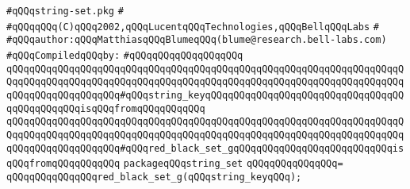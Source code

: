 \label{src/lib/src/string-set.pkg}
\verb|#qQQqstring-set.pkg|\newline
\verb|#|\newline
\verb|#qQQqqQQq(C)qQQq2002,qQQqLucentqQQqTechnologies,qQQqBellqQQqLabs|\newline
\verb|#|\newline
\verb|#qQQqauthor:qQQqMatthiasqQQqBlumeqQQq(blume@research.bell-labs.com)|\newline
\newline
\verb|#qQQqCompiledqQQqby:|\newline
\verb|#qQQqqQQqqQQqqQQqqQQq|\newline
\newline
\verb|qQQqqQQqqQQqqQQqqQQqqQQqqQQqqQQqqQQqqQQqqQQqqQQqqQQqqQQqqQQqqQQqqQQqqQQqqQQqqQQqqQQqqQQqqQQqqQQqqQQqqQQqqQQqqQQqqQQqqQQqqQQqqQQqqQQqqQQqqQQqqQQqqQQqqQQqqQQqqQQq#qQQqstring_keyqQQqqQQqqQQqqQQqqQQqqQQqqQQqqQQqqQQqqQQqqQQqqQQqisqQQqfromqQQqqQQqqQQq|\newline
\verb|qQQqqQQqqQQqqQQqqQQqqQQqqQQqqQQqqQQqqQQqqQQqqQQqqQQqqQQqqQQqqQQqqQQqqQQqqQQqqQQqqQQqqQQqqQQqqQQqqQQqqQQqqQQqqQQqqQQqqQQqqQQqqQQqqQQqqQQqqQQqqQQqqQQqqQQqqQQqqQQq#qQQqred_black_set_gqQQqqQQqqQQqqQQqqQQqqQQqqQQqisqQQqfromqQQqqQQqqQQq|\newline
\verb|packageqQQqstring_set|\newline
\verb|qQQqqQQqqQQqqQQq=|\newline
\verb|qQQqqQQqqQQqqQQqred_black_set_g(qQQqstring_keyqQQq);|\newline

